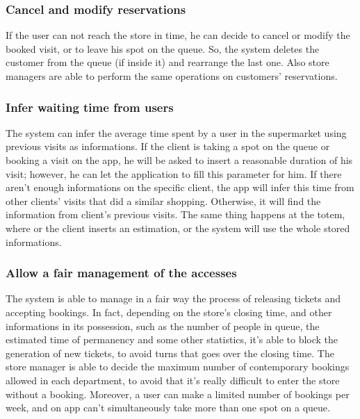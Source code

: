 \documentclass{article}
\begin{document}
		\subsubsection{Cancel and modify reservations}
		
		If the user can not reach the store in time, he can decide to cancel or modify the booked visit, or to leave his spot on the queue. So, the system deletes the customer from the queue (if inside it) and rearrange the last one. Also store managers are able to perform the same operations on customers' reservations. 
		
		
		\subsubsection{Infer waiting time from users}
		
		The system can infer the average time spent by a user in the supermarket using previous visits as informations. If the client is taking a spot on the queue or booking a visit on the app, he will be asked to insert a reasonable duration of his visit; however, he can let the application to fill this parameter for him. If there aren't enough informations on the specific client, the app will infer this time from other clients' visits that did a similar shopping. Otherwise, it will find the information from client's previous visits. The same thing happens at the totem, where or the client inserts an estimation, or the system will use the whole stored informations.
		
		\subsubsection{Allow a fair management of the accesses}
		The system is able to manage in a fair way the process of releasing tickets and accepting bookings. In fact, depending on the store's closing time, and other informations in its possession, such as the number of people in queue, the estimated time of permanency and some other statistics, it's able to block the generation of new tickets, to avoid turns that goes over the closing time. The store manager is able to decide the maximum number of contemporary bookings allowed in each department, to avoid that it's really difficult to enter the store without a booking. Moreover, a user can make a limited number of bookings per week, and on app can't simultaneously take more than one spot on a queue. \\
		
\end{document}
